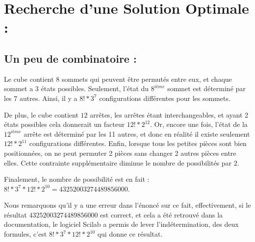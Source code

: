 \documentclass[a4paper,11pt]{article}
\theoremstyle{mytheor}
\begin{document}


\section{Recherche d'une Solution Optimale :}

\subsection{Un peu de combinatoire :}
Le cube contient 8 sommets qui peuvent être permutés entre eux, et chaque sommet a 3 états possibles. Seulement, l'état du $8^{ième}$ sommet est déterminé par les 7 autres. Ainsi, il y a $8 ! * 3^{7}$ configurations différentes pour les sommets.

De plus, le cube contient $12$ arrêtes, les arrêtes étant interchangeables, et ayant 2 états possibles cela donnerait un facteur $12 ! * 2^{12}$. Or, encore une fois, l'état de la $12^{ième}$ arrête est déterminé par les 11 autres, et donc en réalité il existe seulement $12 ! * 2^{11}$ configurations différentes.
Enfin, lorsque tous les petites pièces sont bien positionnées, on ne peut permuter 2 pièces sans changer 2 autres pièces entre elles. Cette contrainte supplémentaire diminue le nombre de possibilités par 2.

Finalement, le nombre de possibilité est en fait : $8 ! * 3^{7} * 12 ! * 2^{10} = 43252003274489856000$.

Nous remarquons qu'il y a une erreur dans l'énoncé sur ce fait, effectivement, si le résultat $43252003274489856000$ est correct, et cela a été retrouvé dans la documentation, le logiciel Scilab
a permis de lever l'indétermination, des deux formules, c'est $8 ! * 3^{7} * 12 ! * 2^{10}$ qui donne ce
résultat.
\end{document}
